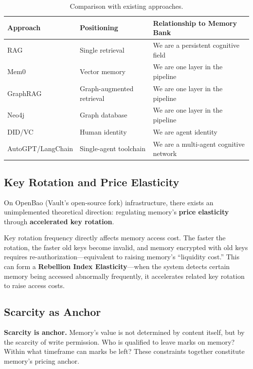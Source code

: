 \documentclass[11pt,a4paper]{article}
\begin{document}
\begin{table}[ht]
\centering
\caption{Comparison with existing approaches.}
\label{tab:related}
\small
\begin{tabular}{@{}lll@{}}
\toprule
\textbf{Approach} & \textbf{Positioning} & \textbf{Relationship to Memory Bank} \\
\midrule
RAG~\cite{lewis2020rag}       & Single retrieval           & We are a persistent cognitive field \\
Mem0~\cite{mem02024}          & Vector memory              & We are one layer in the pipeline \\
GraphRAG~\cite{graphrag2024}  & Graph-augmented retrieval  & We are one layer in the pipeline \\
Neo4j                         & Graph database             & We are one layer in the pipeline \\
DID/VC~\cite{feder2022did}    & Human identity             & We are agent identity \\
AutoGPT/LangChain             & Single-agent toolchain     & We are a multi-agent cognitive network \\
\bottomrule
\end{tabular}
\end{table}

\subsection{Key Rotation and Price Elasticity}
\label{sub:key_rotation}

On OpenBao (Vault's open-source fork) infrastructure, there exists an unimplemented theoretical direction: regulating memory's \textbf{price elasticity} through \textbf{accelerated key rotation}.

Key rotation frequency directly affects memory access cost.
The faster the rotation, the faster old keys become invalid, and memory encrypted with old keys requires re-authorization---equivalent to raising memory's ``liquidity cost.''
This can form a \textbf{Rebellion Index Elasticity}---when the system detects certain memory being accessed abnormally frequently, it accelerates related key rotation to raise access costs.

\subsection{Scarcity as Anchor}
\label{sub:scarcity}

\textbf{Scarcity is anchor.}
Memory's value is not determined by content itself, but by the scarcity of write permission.
Who is qualified to leave marks on memory?
Within what timeframe can marks be left?
These constraints together constitute memory's pricing anchor.
\end{document}
